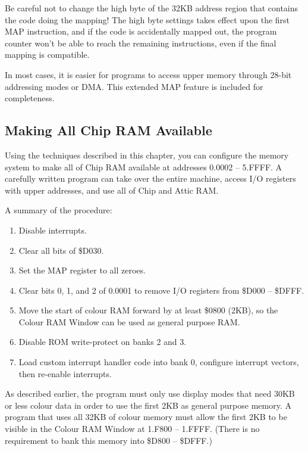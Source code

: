 Be careful not to change the high byte of the 32KB address region that contains
the code doing the mapping! The high byte settings takes effect upon the first
MAP instruction, and if the code is accidentally mapped out, the program
counter won't be able to reach the remaining instructions, even if the final
mapping is compatible.

In most cases, it is easier for programs to access upper memory through 28-bit
addressing modes or DMA.  This extended MAP feature is included for completeness.

\subsection{Making All Chip RAM Available}

Using the techniques described in this chapter, you can configure the memory
system to make all of Chip RAM available at addresses 0.0002 -- 5.FFFF. A
carefully written program can take over the entire machine, access I/O
registers with upper addresses, and use all of Chip and Attic RAM.

A summary of the procedure:

\begin{enumerate}
\item Disable interrupts.
\item Clear all bits of \$D030.
\item Set the MAP register to all zeroes.
\item Clear bits 0, 1, and 2 of 0.0001 to remove I/O registers from \$D000 -- \$DFFF.
\item Move the start of colour RAM forward by at least \$0800 (2KB), so the
Colour RAM Window can be used as general purpose RAM.
\item Disable ROM write-protect on banks 2 and 3.
\item Load custom interrupt handler code into bank 0, configure interrupt vectors, then re-enable interrupts.
\end{enumerate}

As described earlier, the program must only use display modes that need 30KB or
less colour data in order to use the first 2KB as general purpose memory. A
program that uses all 32KB of colour memory must allow the first 2KB to be
visible in the Colour RAM Window at 1.F800 -- 1.FFFF. (There is no requirement
to bank this memory into \$D800 -- \$DFFF.)

